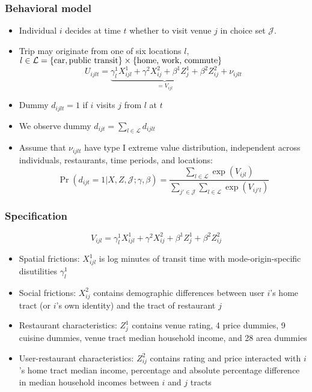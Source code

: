 \documentclass[11pt,notes=hide,aspectratio=169]{beamer}
\begin{document}
\begin{frame}
\frametitle{Behavioral model}   %
\begin{itemize}
	\item Individual $i$ decides at time $t$ whether to visit venue $j$ in choice set $\mathcal{J}$.
	\item Trip may originate from one of six locations $l$, $l \in \mathcal{L} = \left\{\textnormal{car},\textnormal{public transit}\right\} \times \{\textnormal{home, work, commute}\}$
	\begin{equation*}
	U_{ijlt} =\underbrace{\gamma_{l}^{1}X_{ijl}^{1}+\gamma^{2}X_{ij}^{2}+\beta^{1}Z_{j}^{1}+\beta^{2}Z_{ij}^{2}}_{ = V_{ijl}}+\nu_{ijlt}
 	\end{equation*}
	\item Dummy $d_{ijlt}=1$ if $i$ visits $j$ from $l$ at $t$
	\item We observe dummy 
	$d_{ijt} = \sum_{l\in\mathcal{L}}d_{ijlt}$
	\item Assume that $\nu_{ijlt}$ have type I extreme value distribution, independent across individuals, restaurants, time periods, and locations:
	\begin{equation*}
	\Pr(d_{ijt}=1|X,Z,\mathcal{J};\gamma,\beta)=\frac{\sum_{l\in\mathcal{L}}\exp(V_{ijl})}{\sum_{j'\in \mathcal{J}}\sum_{l\in\mathcal{L}}\exp(V_{ij'l})}
	\end{equation*}
\end{itemize}
\end{frame}
\begin{frame}
\frametitle{Specification}
\begin{equation*}
	V_{ijl} = \gamma_{l}^{1}X_{ijl}^{1}+\gamma^{2}X_{ij}^{2}+\beta^{1}Z_{j}^{1}+\beta^{2}Z_{ij}^{2} 
\end{equation*}
\begin{itemize}
	\item Spatial frictions: $X^{1}_{ijl}$ is log minutes of transit time with mode-origin-specific disutilities $\gamma^{1}_{l}$
	\item Social frictions: $X^{2}_{ij}$ contains demographic differences between user $i$'s home tract (or $i$'s own identity) and the tract of restaurant $j$
	\item Restaurant characteristics: $Z_{j}^{1}$ contains venue rating, 4 price dummies, 9 cuisine dummies, venue tract median household income, and 28 area dummies
	\item User-restaurant characteristics: $Z_{ij}^{2}$ contains rating and price interacted with $i$'s home tract median income, percentage and absolute percentage difference in median household incomes between $i$ and $j$ tracts %
\end{itemize}
\end{frame}
\end{document}

